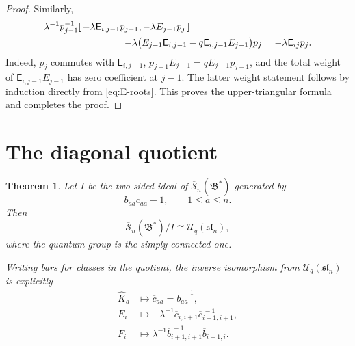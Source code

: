 \documentclass[11pt]{article}
\newtheorem{theorem}{Theorem}[section]
\theoremstyle{remark}
\newcommand{\UU}{\mathcal U_q}
\newcommand{\rSk}{\overline{\mathscr S}_n}
\newcommand{\Bstar}{\mathfrak B^{*}}
\newcommand{\slie}{\mathfrak{sl}_n}
\begin{document}
\begin{proof}
Similarly,
\[
 \begin{split}
 &\lambda^{-1}p_{j-1}^{-1}
   [\,-\lambda\mathsf E_{i,j-1}p_{j-1},
      -\lambda E_{j-1}p_j\,]\\
 &\hspace{25mm}
 =-\lambda
   \bigl(E_{j-1}\mathsf E_{i,j-1}
            -q\mathsf E_{i,j-1}E_{j-1}\bigr)p_j
 =-\lambda\mathsf E_{ij}p_j.
 \end{split}
\]
Indeed, $p_j$ commutes with $\mathsf E_{i,j-1}$,
$p_{j-1}E_{j-1}=qE_{j-1}p_{j-1}$, and the total weight of
$\mathsf E_{i,j-1}E_{j-1}$ has zero coefficient at $j-1$.
The latter weight statement follows by induction directly from
\eqref{eq:E-roots}.  This proves the upper-triangular formula and
completes the proof.
\end{proof}

\section{The diagonal quotient}

\begin{theorem}\label{thm:quotient}
Let $I$ be the two-sided ideal of $\rSk(\Bstar)$ generated by
\[
 b_{aa}c_{aa}-1,\qquad 1\leq a\leq n.
\]
Then
\[
 \rSk(\Bstar)/I\cong\UU(\slie),
\]
where the quantum group is the simply-connected one.

Writing bars for classes in the quotient, the inverse
isomorphism from $\UU(\slie)$ is explicitly
\begin{align}
 \widehat K_a
   &\longmapsto \overline c_{aa}
      =\overline b_{aa}^{\, -1},
 \label{eq:quotient-torus}\\
 E_i
   &\longmapsto
       -\lambda^{-1}\overline c_{i,i+1}
                         \overline c_{i+1,i+1}^{\, -1},
 \label{eq:quotient-E}\\
 F_i
   &\longmapsto
       \lambda^{-1}\overline b_{i+1,i+1}^{\, -1}
                        \overline b_{i+1,i}.
 \label{eq:quotient-F}
\end{align}
\end{theorem}
\end{document}
